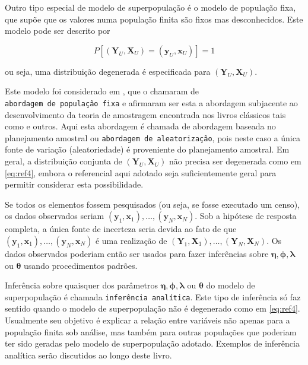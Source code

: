 \documentclass[]{book}
\theoremstyle{definition}
\theoremstyle{definition}
\theoremstyle{definition}
\theoremstyle{remark}
\begin{document}
Outro tipo especial de modelo de superpopulação é o modelo de população
fixa, que supõe que os valores numa população finita são fixos mas
desconhecidos. Este modelo pode ser descrito por

\begin{equation}
P\left[ \left( \mathbf{Y}_U , \mathbf{X}_U \right) = \left( \mathbf{y}_U , \mathbf{x}_U \right) \right] = 1 \label{eq:ref4}
\end{equation}

ou seja, uma distribuição degenerada é especificada para
\(\left(\mathbf{Y}_U , \mathbf{X}_U \right)\).

Este modelo foi considerado em \citep{cassel}, que o chamaram de
\texttt{abordagem\ de\ população\ fixa} e afirmaram ser esta a abordagem
subjacente ao desenvolvimento da teoria de amostragem encontrada nos
livros clássicos tais como \citep{cochran} e outros. Aqui esta abordagem
é chamada de abordagem baseada no planejamento amostral ou
\texttt{abordagem\ de\ aleatorização}, pois neste caso a única fonte de
variação (aleatoriedade) é proveniente do planejamento amostral. Em
geral, a distribuição conjunta de
\(\left( \mathbf{Y}_U , \mathbf{X}_U \right)\) não precisa ser
degenerada como em \eqref{eq:ref4}, embora o referencial aqui adotado seja
suficientemente geral para permitir considerar esta possibilidade.

Se todos os elementos fossem pesquisados (ou seja, se fosse executado um
censo), os dados observados seriam
\((\mathbf{y}_1 , \mathbf{x}_1) ,\ldots, (\mathbf{y}_N , \mathbf{x}_N)\).
Sob a hipótese de resposta completa, a única fonte de incerteza seria
devida ao fato de que
\((\mathbf{y}_1 , \mathbf{x}_1) ,\ldots, (\mathbf{y}_N , \mathbf{x}_N)\)
é uma realização de
\(\left( \mathbf{Y}_1 , \mathbf{X}_1 \right) ,\ldots, \left( \mathbf{Y}_N , \mathbf{X}_N \right)\).
Os dados observados poderiam então ser usados para fazer inferências
sobre \(\mathbf{\eta}, \mathbf{\phi},\mathbf{\lambda}\) ou
\(\mathbf{\theta}\) usando procedimentos padrões.

Inferência sobre quaisquer dos parâmetros
\(\mathbf{\eta},\mathbf{\phi},\mathbf{\lambda}\) ou \(\mathbf{\theta}\)
do modelo de superpopulação é chamada \texttt{inferência\ analítica}.
Este tipo de inferência só faz sentido quando o modelo de superpopulação
não é degenerado como em \eqref{eq:ref4}. Usualmente seu objetivo é
explicar a relação entre variáveis não apenas para a população finita
sob análise, mas também para outras populações que poderiam ter sido
geradas pelo modelo de superpopulação adotado. Exemplos de inferência
analítica serão discutidos ao longo deste livro.
\end{document}
